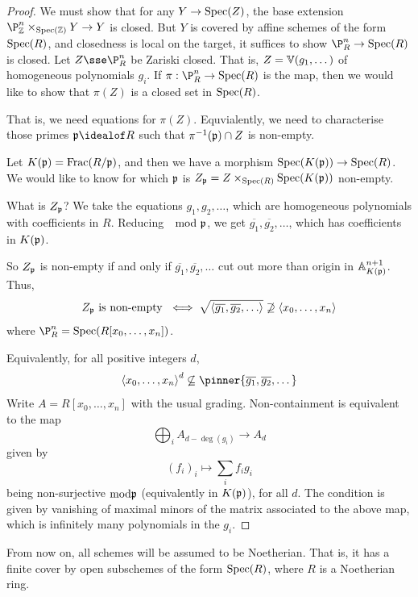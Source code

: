 \documentclass{article}
\begin{document}
\begin{proof}
    We must show that for any \(Y \to \operatorname{Spec}(Z)\), the base extension \(\P^n_\Z \times_{\Spec(\Z)} Y \to Y\) is closed. But \(Y\) is covered by affine schemes of the form \(\operatorname{Spec}(R)\), and closedness is local on the target, it suffices to show \(\P^n_R \to \Spec(R)\) is closed. Let \(Z \sse \P^n_R\) be Zariski closed. That is, \(Z = \mathbb{V}(g_1, \dots)\) of homogeneous polynomials \(g_i\). If \(\pi : \P^n_R \to \Spec(R)\) is the map, then we would like to show that \(\pi(Z)\) is a closed set in \(\operatorname{Spec}(R)\).

    That is, we need equations for \(\pi(Z)\). Equvialently, we need to characterise those primes \(\mfp \idealof R\) such that \(\pi^{-1}(\mathfrak{p}) \cap Z\) is non-empty.

    Let \(K(\mathfrak{p}) = \operatorname{Frac}(R/\mathfrak{p})\), and then we have a morphism \(\operatorname{Spec}(K(\mathfrak{p})) \to \operatorname{Spec}(R)\). We would like to know for which \(\mathfrak{p}\) is \(Z_{\mathfrak{p}} = Z \times_{\operatorname{Spec}(R)} \operatorname{Spec}(K(\mathfrak{p}))\) non-empty.

    What is \(Z_{\mathfrak{p}}\)? We take the equations \(g_1, g_2, \dots\), which are homogeneous polynomials with coefficients in \(R\). Reducing \(\mod {\mathfrak{p}}\), we get \(\overline{g_1}, \overline{g_2}, \dots\), which has coefficients in \(K(\mathfrak{p})\).

    So \(Z_{\mathfrak{p}}\) is non-empty if and only if \(\overline{g_1}, \overline{g_2}, \dots\) cut out more than origin in \(\mathbb{A}_{K(\mathfrak{p})}^{n+1}\). Thus,
    \[Z_\mfp \text{ is non-empty } \iff \sqrt{\inner{\overline{g_1}, \overline{g_2}, \dots}}\not\supseteq \inner{x_0, \dots, x_n}\]
    where \(\P^n_R = \Spec(R[x_0, \dots, x_n])\).

    Equivalently, for all positive integers \(d\),
    \[\inner{x_0, \dots, x_n}^d \not\subseteq \pinner{\overline{g_1}, \overline{g_2}, \dots}\]
    Write \(A = R[x_0, \dots, x_n]\) with the usual grading. Non-containment is equivalent to the map
    \[\bigoplus_i A_{d - \deg(g_i)} \to A_d\]
    given by
    \[(f_i)_i \mapsto \sum_i f_ig_i\]
    being non-surjective \(\mathrm{mod } \mathfrak{p}\) (equivalently in \(K(\mathfrak{p})\)), for all \(d\). The condition is given by vanishing of maximal minors of the matrix associated to the above map, which is infinitely many polynomials in the \(g_i\).
\end{proof}

From now on, all schemes will be assumed to be Noetherian. That is, it has a finite cover by open subschemes of the form \(\operatorname{Spec}(R)\), where \(R\) is a Noetherian ring.
\end{document}
